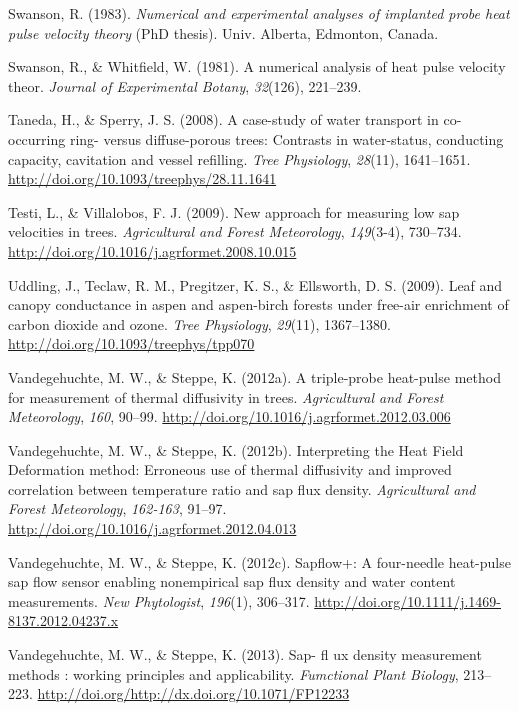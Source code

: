 \documentclass[11pt,twoside]{reedthesis}
\begin{document}
\hypertarget{ref-Swanson1983}{}
Swanson, R. (1983). \emph{Numerical and experimental analyses of
implanted probe heat pulse velocity theory} (PhD thesis). Univ. Alberta,
Edmonton, Canada.

\hypertarget{ref-Swanson1981}{}
Swanson, R., \& Whitfield, W. (1981). A numerical analysis of heat pulse
velocity theor. \emph{Journal of Experimental Botany}, \emph{32}(126),
221--239.

\hypertarget{ref-Taneda2008}{}
Taneda, H., \& Sperry, J. S. (2008). A case-study of water transport in
co-occurring ring- versus diffuse-porous trees: Contrasts in
water-status, conducting capacity, cavitation and vessel refilling.
\emph{Tree Physiology}, \emph{28}(11), 1641--1651.
\url{http://doi.org/10.1093/treephys/28.11.1641}

\hypertarget{ref-Testi2009}{}
Testi, L., \& Villalobos, F. J. (2009). New approach for measuring low
sap velocities in trees. \emph{Agricultural and Forest Meteorology},
\emph{149}(3-4), 730--734.
\url{http://doi.org/10.1016/j.agrformet.2008.10.015}

\hypertarget{ref-Uddling2009}{}
Uddling, J., Teclaw, R. M., Pregitzer, K. S., \& Ellsworth, D. S.
(2009). Leaf and canopy conductance in aspen and aspen-birch forests
under free-air enrichment of carbon dioxide and ozone. \emph{Tree
Physiology}, \emph{29}(11), 1367--1380.
\url{http://doi.org/10.1093/treephys/tpp070}

\hypertarget{ref-Vandegehuchte2012}{}
Vandegehuchte, M. W., \& Steppe, K. (2012a). A triple-probe heat-pulse
method for measurement of thermal diffusivity in trees.
\emph{Agricultural and Forest Meteorology}, \emph{160}, 90--99.
\url{http://doi.org/10.1016/j.agrformet.2012.03.006}

\hypertarget{ref-Vandegehuchte2012a}{}
Vandegehuchte, M. W., \& Steppe, K. (2012b). Interpreting the Heat Field
Deformation method: Erroneous use of thermal diffusivity and improved
correlation between temperature ratio and sap flux density.
\emph{Agricultural and Forest Meteorology}, \emph{162-163}, 91--97.
\url{http://doi.org/10.1016/j.agrformet.2012.04.013}

\hypertarget{ref-Vandegehuchte2012c}{}
Vandegehuchte, M. W., \& Steppe, K. (2012c). Sapflow+: A four-needle
heat-pulse sap flow sensor enabling nonempirical sap flux density and
water content measurements. \emph{New Phytologist}, \emph{196}(1),
306--317. \url{http://doi.org/10.1111/j.1469-8137.2012.04237.x}

\hypertarget{ref-Vandegehuchte2013}{}
Vandegehuchte, M. W., \& Steppe, K. (2013). Sap- fl ux density
measurement methods : working principles and applicability.
\emph{Fumctional Plant Biology}, 213--223.
\url{http://doi.org/http://dx.doi.org/10.1071/FP12233}
\end{document}

